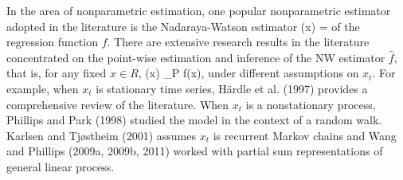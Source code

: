 In the area of nonparametric estimation, one popular nonparametric estimator adopted in the literature is the Nadaraya-Watson estimator
\bestar
  (x) = 
\eestar
of the regression function $f$. There are extensive research results in the literature concentrated on the point-wise estimation and inference of the NW estimator $\hat{f}$, that is, for any fixed $x \in R$,
\bestar
{}(x) \to_P f(x),
\eestar
under different assumptions on $x_t$. For example, when $x_t$ is stationary time series, H\"{a}rdle et al. (1997) provides a comprehensive review of the literature. When $x_t$ is a nonstationary process, Phillips and Park (1998) studied the model in the context of a random walk. Karlsen and Tj\o stheim (2001) assumes $x_t$ is recurrent Markov chains and Wang and Phillips (2009a, 2009b, 2011) worked with partial sum representations of general linear process. 

